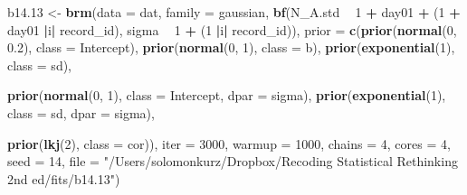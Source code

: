 \documentclass[]{article}
\newenvironment{Shaded}{\begin{snugshade}}{\end{snugshade}}
\newcommand{\DataTypeTok}[1]{\textcolor[rgb]{0.13,0.29,0.53}{#1}}
\newcommand{\DecValTok}[1]{\textcolor[rgb]{0.00,0.00,0.81}{#1}}
\newcommand{\FloatTok}[1]{\textcolor[rgb]{0.00,0.00,0.81}{#1}}
\newcommand{\KeywordTok}[1]{\textcolor[rgb]{0.13,0.29,0.53}{\textbf{#1}}}
\newcommand{\NormalTok}[1]{#1}
\newcommand{\OperatorTok}[1]{\textcolor[rgb]{0.81,0.36,0.00}{\textbf{#1}}}
\newcommand{\StringTok}[1]{\textcolor[rgb]{0.31,0.60,0.02}{#1}}
\begin{document}
\begin{Shaded}
\begin{Highlighting}[]
\NormalTok{b14}\FloatTok{.13}\NormalTok{ <-}
\StringTok{  }\KeywordTok{brm}\NormalTok{(}\DataTypeTok{data =}\NormalTok{ dat,}
      \DataTypeTok{family =}\NormalTok{ gaussian,}
      \KeywordTok{bf}\NormalTok{(N_A.std }\OperatorTok{~}\StringTok{ }\DecValTok{1} \OperatorTok{+}\StringTok{ }\NormalTok{day01 }\OperatorTok{+}\StringTok{ }\NormalTok{(}\DecValTok{1} \OperatorTok{+}\StringTok{ }\NormalTok{day01 }\OperatorTok{|}\NormalTok{i}\OperatorTok{|}\StringTok{ }\NormalTok{record_id),}
\NormalTok{         sigma }\OperatorTok{~}\StringTok{ }\DecValTok{1} \OperatorTok{+}\StringTok{ }\NormalTok{(}\DecValTok{1} \OperatorTok{|}\NormalTok{i}\OperatorTok{|}\StringTok{ }\NormalTok{record_id)),}
      \DataTypeTok{prior =} \KeywordTok{c}\NormalTok{(}\KeywordTok{prior}\NormalTok{(}\KeywordTok{normal}\NormalTok{(}\DecValTok{0}\NormalTok{, }\FloatTok{0.2}\NormalTok{), }\DataTypeTok{class =}\NormalTok{ Intercept),}
                \KeywordTok{prior}\NormalTok{(}\KeywordTok{normal}\NormalTok{(}\DecValTok{0}\NormalTok{, }\DecValTok{1}\NormalTok{), }\DataTypeTok{class =}\NormalTok{ b),}
                \KeywordTok{prior}\NormalTok{(}\KeywordTok{exponential}\NormalTok{(}\DecValTok{1}\NormalTok{), }\DataTypeTok{class =}\NormalTok{ sd),}
                
                \KeywordTok{prior}\NormalTok{(}\KeywordTok{normal}\NormalTok{(}\DecValTok{0}\NormalTok{, }\DecValTok{1}\NormalTok{), }\DataTypeTok{class =}\NormalTok{ Intercept, }\DataTypeTok{dpar =}\NormalTok{ sigma),}
                \KeywordTok{prior}\NormalTok{(}\KeywordTok{exponential}\NormalTok{(}\DecValTok{1}\NormalTok{), }\DataTypeTok{class =}\NormalTok{ sd, }\DataTypeTok{dpar =}\NormalTok{ sigma),}
                
                \KeywordTok{prior}\NormalTok{(}\KeywordTok{lkj}\NormalTok{(}\DecValTok{2}\NormalTok{), }\DataTypeTok{class =}\NormalTok{ cor)),}
      \DataTypeTok{iter =} \DecValTok{3000}\NormalTok{, }\DataTypeTok{warmup =} \DecValTok{1000}\NormalTok{, }\DataTypeTok{chains =} \DecValTok{4}\NormalTok{, }\DataTypeTok{cores =} \DecValTok{4}\NormalTok{,}
      \DataTypeTok{seed =} \DecValTok{14}\NormalTok{,}
      \DataTypeTok{file =} \StringTok{"/Users/solomonkurz/Dropbox/Recoding Statistical Rethinking 2nd ed/fits/b14.13"}\NormalTok{)}
\end{Highlighting}
\end{Shaded}
\end{document}
